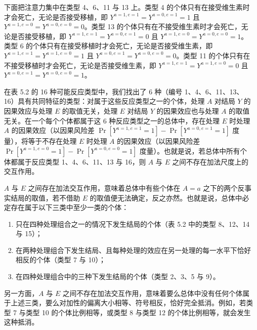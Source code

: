 下面把注意力集中在类型 4、6、11 与 13 上。类型 4 的个体只有在接受维生素时才会死亡，无论是否接受移植，即 $Y^{a=1,e=1}=Y^{a=0,e=1}=1$ 且 $Y^{a=1,e=0}=Y^{a=0,e=0}=0$。类型 13 的个体只有在不接受维生素时才会死亡，无论是否接受移植，即 $Y^{a=1,e=1}=Y^{a=0,e=1}=0$ 且 $Y^{a=1,e=0}=Y^{a=0,e=0}=1$。类型 6 的个体只有在接受移植时才会死亡，无论是否接受维生素，即 $Y^{a=1,e=1}=Y^{a=1,e=0}=1$ 且 $Y^{a=0,e=1}=Y^{a=0,e=0}=0$。类型 11 的个体只有在不接受移植时才会死亡，无论是否接受维生素，即 $Y^{a=1,e=1}=Y^{a=1,e=0}=0$ 且 $Y^{a=0,e=1}=Y^{a=0,e=0}=1$。


在表 5.2 的 16 种可能反应类型中，我们找出了 6 种（编号 1、4、6、11、13、16）具有共同特征的类型：对属于这些反应类型之一的个体，处理 $A$ 对结局 $Y$ 的因果效应与处理 $E$ 的取值无关，处理 $E$ 对结局 $Y$ 的因果效应也与处理 $A$ 的取值无关。在一个每个个体都属于这 6 种反应类型之一的总体中，存在处理 $E$ 时处理 $A$ 的因果效应（以因果风险差 $\Pr[Y^{a=1,e=1}=1]-\Pr[Y^{a=0,e=1}=1]$ 度量），将等于不存在处理 $E$ 时处理 $A$ 的因果效应（以因果风险差 $\Pr[Y^{a=1,e=0}=1]-\Pr[Y^{a=0,e=0}=1]$ 度量）。也就是说，若总体中所有个体都属于反应类型 1、4、6、11、13 与 16，则 $A$ 与 $E$ 之间不存在加法尺度上的交互作用。


$A$ 与 $E$ 之间存在加法交互作用，意味着总体中有些个体在 $A=a$ 之下的两个反事实结局的取值，若不借助 $E$ 的取值便无法确定，反之亦然。也就是说，总体中必定存在属于以下三类中至少一类的个体：

\begin{enumerate}
\item 只在四种处理组合之一的情况下发生结局的个体（表 5.2 中的类型 8、12、14 与 15）；
\item 在两种处理组合下发生结局、且每种处理的效应在另一处理的每一水平下恰好相反的个体（类型 7 与 10）；
\item 在四种处理组合中的三种下发生结局的个体（类型 2、3、5 与 9）。
\end{enumerate}

另一方面，$A$ 与 $E$ 之间不存在加法交互作用，意味着要么总体中没有任何个体属于上述三类，要么对加性的偏离大小相等、符号相反，恰好完全抵消。例如，若类型 7 与类型 10 的个体比例相等，或类型 8 与类型 12 的个体比例相等，就会发生这种抵消。


